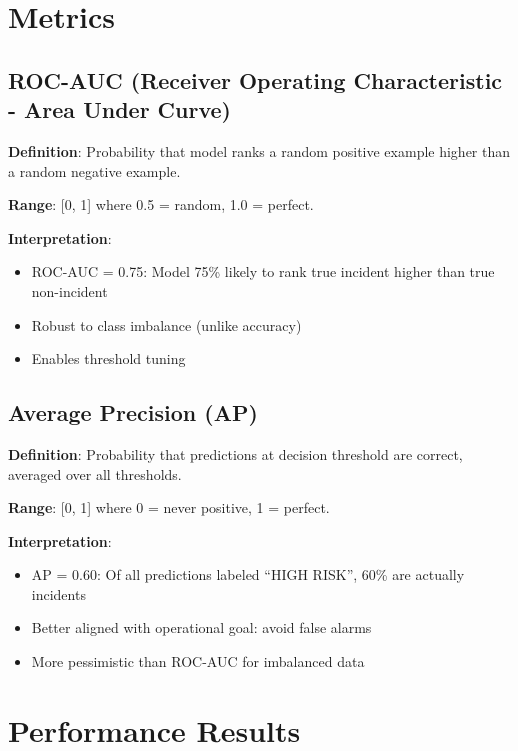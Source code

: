 \documentclass[11pt,a4paper,oneside]{report}
\begin{document}
\section{Metrics}

\subsection{ROC-AUC (Receiver Operating Characteristic - Area Under Curve)}

\textbf{Definition}: Probability that model ranks a random positive example higher than a random negative example.

\textbf{Range}: [0, 1] where 0.5 = random, 1.0 = perfect.

\textbf{Interpretation}: 
\begin{itemize}
    \item ROC-AUC = 0.75: Model 75\% likely to rank true incident higher than true non-incident
    \item Robust to class imbalance (unlike accuracy)
    \item Enables threshold tuning
\end{itemize}

\subsection{Average Precision (AP)}

\textbf{Definition}: Probability that predictions at decision threshold are correct, averaged over all thresholds.

\textbf{Range}: [0, 1] where 0 = never positive, 1 = perfect.

\textbf{Interpretation}:
\begin{itemize}
    \item AP = 0.60: Of all predictions labeled ``HIGH RISK'', 60\% are actually incidents
    \item Better aligned with operational goal: avoid false alarms
    \item More pessimistic than ROC-AUC for imbalanced data
\end{itemize}

\section{Performance Results}
\end{document}
